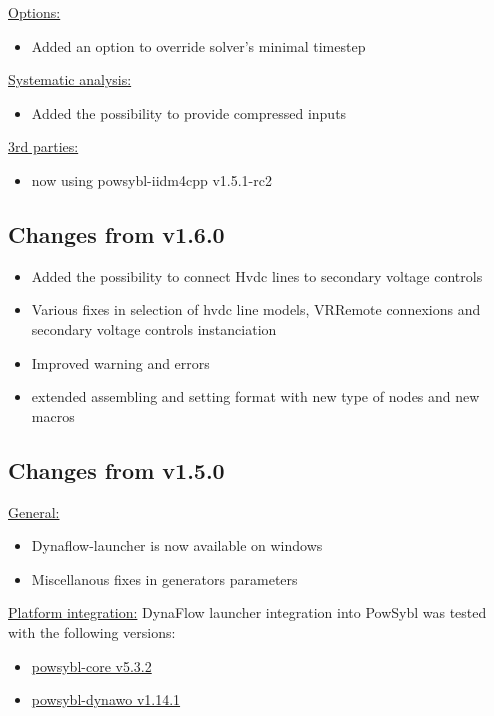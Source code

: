 \documentclass[a4paper, 12pt]{report}
\begin{document}
\underline{Options:}
\begin{itemize}
\item Added an option to override solver's minimal timestep
\end{itemize}

\underline{Systematic analysis:}
\begin{itemize}
\item Added the possibility to provide compressed inputs
\end{itemize}

\underline{3rd parties:}
\begin{itemize}
\item now using powsybl-iidm4cpp v1.5.1-rc2
\end{itemize}

\subsection{Changes from v1.6.0}

\begin{itemize}
\item Added the possibility to connect Hvdc lines to secondary voltage controls
\item Various fixes in selection of hvdc line models, VRRemote connexions and secondary voltage controls instanciation
\item Improved warning and errors
\item extended assembling and setting format with new type of nodes and new macros
\end{itemize}

\subsection{Changes from v1.5.0}

\underline{General:}

\begin{itemize}
\item Dynaflow-launcher is now available on windows
\item Miscellanous fixes in generators parameters
\end{itemize}

\underline{Platform integration:}
DynaFlow launcher integration into PowSybl was tested with the following versions:
\begin{itemize}
\item \href{https://github.com/powsybl/powsybl-core/releases/tag/v5.3.2}{powsybl-core v5.3.2}
\item \href{https://github.com/powsybl/powsybl-dynawo/releases/tag/v1.14.1}{powsybl-dynawo v1.14.1}
\end{itemize}
\end{document}
